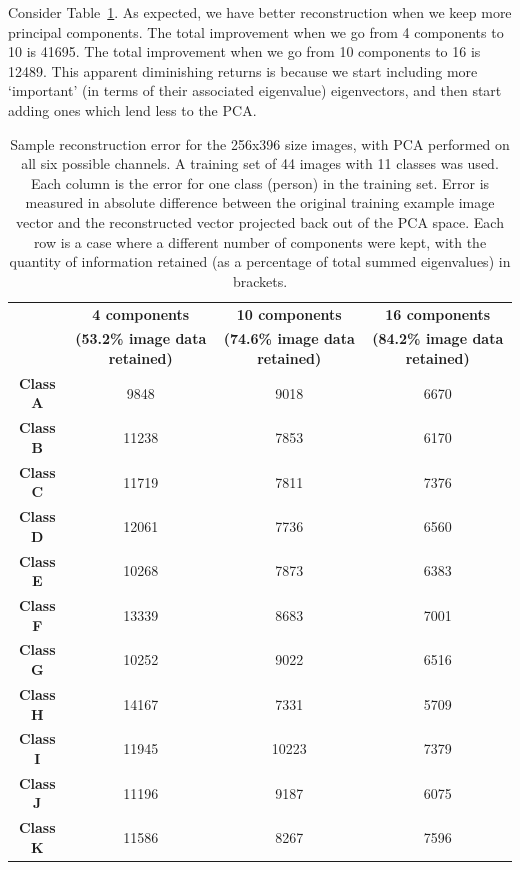 Consider Table~\ref{tbl:face-rec-2}. As expected, we have better reconstruction when we keep more principal components. The total improvement when we go from 4 components to 10 is 41695. The total improvement when we go from 10 components to 16 is 12489. This apparent diminishing returns is because we start including more `important' (in terms of their associated eigenvalue) eigenvectors, and then start adding ones which lend less to the PCA.

\begin{table}[h!]
  \centering
  \begin{tabular}{c c c c}
    \toprule
    \textbf{ } & \textbf{4 components} & \textbf{10 components} & \textbf{16 components} \\
    \textbf{ } & \textbf{(53.2\% image data retained)} & \textbf{(74.6\% image data retained)} & \textbf{(84.2\% image data retained)} \\
    \midrule
    \textbf{Class A} & 9848 & 9018 & 6670\\
    \textbf{Class B} & 11238 & 7853 & 6170\\ 
    \textbf{Class C} & 11719 & 7811 & 7376\\ 
    \textbf{Class D} & 12061 & 7736 & 6560\\
    \textbf{Class E} & 10268 & 7873 & 6383\\
    \textbf{Class F} & 13339 & 8683 & 7001\\ 
    \textbf{Class G} & 10252 & 9022 & 6516\\ 
    \textbf{Class H} & 14167 & 7331 & 5709\\
    \textbf{Class I} & 11945 & 10223 & 7379\\
    \textbf{Class J} & 11196 & 9187 & 6075\\ 
    \textbf{Class K} & 11586 & 8267 & 7596\\
    \bottomrule
  \end{tabular}
  \caption[Sample reconstruction error for the 256x396 size images]{Sample reconstruction error for the 256x396 size images, with PCA performed on all six possible channels. A training set of 44 images with 11 classes was used. Each column is the error for one class (person) in the training set. Error is measured in absolute difference between the original training example image vector and the reconstructed vector projected back out of the PCA space. Each row is a case where a different number of components were kept, with the quantity of information retained (as a percentage of total summed eigenvalues) in brackets.}
  \label{tbl:face-rec-2}
\end{table}

